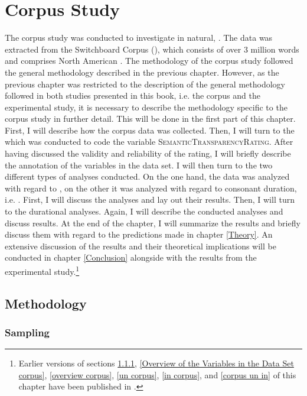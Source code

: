 \chapter {Corpus Study}
\label{Corpus Studies}


The corpus study was conducted to investigate  in natural, . 
The data was extracted from the Switchboard Corpus (\citealt{Godfrey.1997}), which consists of over 3 million words and comprises North American . 
The methodology of the corpus study followed the general methodology described in the previous chapter. However, as the previous chapter was restricted to the description of the general methodology followed in both  studies presented in this book, i.e. the corpus and the experimental study,  it is necessary to describe the methodology specific to the corpus study in further detail. This will be done in the first part of this chapter.
 First, I will describe how the corpus data was collected. Then, I will turn to the  which was conducted to code the variable \textsc{SemanticTransparencyRating}. After having discussed the validity and reliability of the rating, I will briefly describe the annotation of the variables in the data set. I will then turn to the two different types of analyses conducted.
 On the one hand, the data was analyzed with regard to , on the other it was analyzed with regard to consonant duration, i.e. . 
First, I will discuss the  analyses and lay out their results. 
Then, I will turn to the durational analyses. Again, I will describe the conducted analyses and discuss results.  At the end of the chapter, I will summarize the results and briefly discuss them with regard to the predictions made in chapter \ref{Theory}. An extensive discussion of the results and their theoretical implications will be conducted in chapter \ref{Conclusion} alongside with the results from the experimental study.\footnote{Earlier versions of sections \ref{sampling corpus},  \ref{Overview of the Variables in the Data Set corpus}, \ref{overview corpus}, \ref{un corpus}, \ref{in corpus}, and \ref{corpus un in} of this chapter have been published in \cite{BenHedia.2017}.} 


\section{Methodology}

\subsection{Sampling}\label{sampling corpus}

